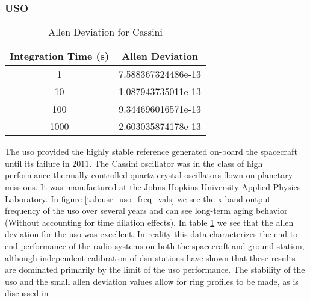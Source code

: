 \documentclass[crop=false,class=article,oneside]{standalone}
\begin{document}
        \subsubsection{\footnotesize{USO}}
            \label{subsubsec:usr_USO}
            \begin{table}[H]
                \centering
                \captionsetup{type=table}
                \caption{Allen Deviation for Cassini}
                \label{tab:Allen_Deviation_for_Cassini}
                \begin{tabular}{|c|c|}
                    \hline
                    Integration Time (s)&Allen Deviation\\
                    \hline
                    1&7.588367324486e-13\\
                    10&1.087943735011e-13\\
                    100&9.344696016571e-13\\
                    1000&2.603035874178e-13\\
                    \hline
                \end{tabular}
            \end{table}
            The \gls{uso} provided the highly stable
            reference generated on-board the spacecraft
            until its failure in $2011$. The Cassini
            oscillator was in the class of high performance
            thermally-controlled quartz crystal oscillators
            flown on planetary missions. It was manufactured
            at the Johns Hopkins University Applied Physics
            Laboratory. In figure
            \ref{tab:usr_uso_freq_vals} we see the
            \gls{x-band} output frequency of the \gls{uso}
            over several years and can see long-term aging
            behavior
            (Without accounting for time dilation effects).
            In table \ref{tab:Allen_Deviation_for_Cassini}
            we see that the \gls{allen deviation} for the
            \gls{uso} was excellent. In reality this data
            characterizes the end-to-end performance of
            the radio systems on both the spacecraft and
            ground station, although independent
            calibration of \gls{dsn} stations have shown
            that these results are dominated primarily by
            the limit of the \gls{uso} performance.
            The stability of the \gls{uso} and the small
            \gls{allen deviation} values allow for
             ring
            profiles to be made, as is discussed in
\end{document}
